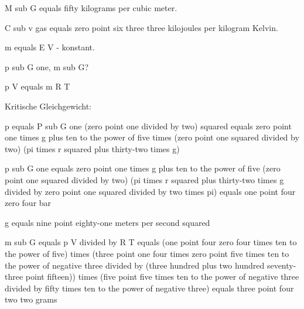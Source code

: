 M sub G equals fifty kilograms per cubic meter.

C sub v gas equals zero point six three three kilojoules per kilogram Kelvin.

m equals E V - konstant.

p sub G one, m sub G?

p V equals m R T

Kritische Gleichgewicht: 

p equals P sub G one (zero point one divided by two) squared equals zero point one times g plus ten to the power of five times (zero point one squared divided by two) (pi times r squared plus thirty-two times g)

p sub G one equals zero point one times g plus ten to the power of five (zero point one squared divided by two) (pi times r squared plus thirty-two times g divided by zero point one squared divided by two times pi) equals one point four zero four bar

g equals nine point eighty-one meters per second squared

m sub G equals p V divided by R T equals (one point four zero four times ten to the power of five) times (three point one four times zero point five times ten to the power of negative three divided by (three hundred plus two hundred seventy-three point fifteen)) times (five point five times ten to the power of negative three divided by fifty times ten to the power of negative three) equals three point four two two grams